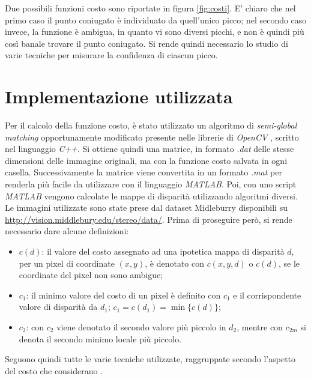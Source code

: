 \documentclass[12pt]{report}
\begin{document}
		\noindent Due possibili funzioni costo sono riportate in figura \ref{fig:costi}. E' chiaro che nel primo caso il punto coniugato  è individuato da quell'unico picco; nel secondo caso invece, la funzione è ambigua, in quanto vi sono diversi picchi, e non è quindi più così banale trovare il punto coniugato. Si rende quindi necessario lo studio di varie tecniche per misurare la confidenza di ciascun picco.
		
		
		\section{Implementazione utilizzata}
		\label{sec:implementazione}
		
		Per il calcolo della funzione costo, è stato utilizzato un algoritmo di \textit{semi-global matching} opportunamente modificato presente nelle librerie di \textit{OpenCV} \cite{opencv}, scritto nel linguaggio \textit{C++}. Si ottiene quindi una matrice, in formato \textit{.dat} delle stesse dimensioni delle immagine originali, ma con la funzione costo salvata in ogni casella. Successivamente la matrice viene convertita in un formato \textit{.mat} per renderla più facile da utilizzare con il linguaggio \textit{MATLAB}. Poi, con uno script \textit{MATLAB} vengono calcolate le mappe di disparità utilizzando algoritmi diversi. Le immagini utilizzate sono state prese dal dataset Midleburry \cite{dataset_2006_1,dataset_2006_2} disponibili su \url{http://vision.middlebury.edu/stereo/data/}. \newline
		Prima di proseguire però, si rende necessario dare alcune definizioni:
		
		\begin{itemize}
		
			\item $c(d)$: il valore del costo assegnato ad una ipotetica mappa di disparità $d$, per un pixel di coordinate $(x,y)$, è denotato con $c(x,y,d)$ o $c(d)$, se le coordinate del pixel non sono ambigue;
			
			\item $c_{1}$: il minimo valore del costo di un pixel è definito con $c_{1}$ e il corrispondente valore di disparità da $d_{1}$; $c_{1}=c(d_{1})=\min\{c(d)\}$;
			
			\item $c_{2}$: con $c_{2}$ viene denotato il secondo valore più piccolo in $d_{2}$, mentre con $c_{2m}$ si denota il secondo minimo locale più piccolo.
			
		\end{itemize}
		Seguono quindi tutte le varie tecniche utilizzate, raggruppate secondo l'aspetto del costo che considerano \cite{indoors_outdoors}.
		
\end{document}
